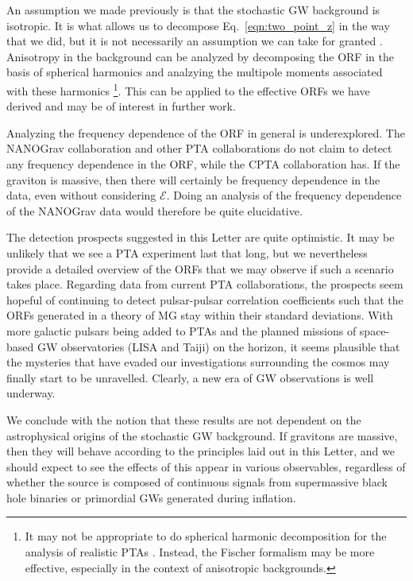 \documentclass[prd,twocolumn,aps,psfig,nofootinbib,nobibnotes,superscriptaddress,preprintnumbers,times]{revtex4-2}
\begin{document}
An assumption we made previously is that the stochastic GW background is isotropic. It is what allows us to decompose Eq.\ \ref{eqn:two_point_z} in the way that we did, but it is not necessarily an assumption we can take for granted \cite{Depta:2024ykq, Bravo:2025csu, Cusin:2025xle, Kuwahara:2024jiz, Li:2024lvt}. Anisotropy in the background can be analyzed by decomposing the ORF in the basis of spherical harmonics and analzying the multipole moments associated with these harmonics \cite{Allen:2024bnk, Gair:2014rwa}\footnote{It may not be appropriate to do spherical harmonic decomposition for the analysis of realistic PTAs \cite{Ali-Haimoud:2020ozu}. Instead, the Fischer formalism may be more effective, especially in the context of anisotropic backgrounds.}. This can be applied to the effective ORFs we have derived and may be of interest in further work. 

Analyzing the frequency dependence of the ORF in general is underexplored. The NANOGrav collaboration and other PTA collaborations do not claim to detect any frequency dependence in the ORF, while the CPTA collaboration has. If the graviton is massive, then there will certainly be frequency dependence in the data, even without considering $\mathcal{E}$. Doing an analysis of the frequency dependence of the NANOGrav data would therefore be quite elucidative. 

The detection prospects suggested in this Letter are quite optimistic. It may be unlikely that we see a PTA experiment last that long, but we nevertheless provide a detailed overview of the ORFs that we may observe if such a scenario takes place. Regarding data from current PTA collaborations, the prospects seem hopeful of continuing to detect pulsar-pulsar correlation coefficients such that the ORFs generated in a theory of MG  stay within their standard deviations. With more galactic pulsars being added to PTAs and the planned missions of space-based GW observatories (LISA and Taiji) on the horizon, it seems plausible that the mysteries that have evaded our investigations surrounding the cosmos may finally start to be unravelled. Clearly, a new era of GW observations is well underway. 

We conclude with the notion that these results are not dependent on the astrophysical origins of the stochastic GW background. If gravitons are massive, then they will behave according to the principles laid out in this Letter, and we should expect to see the effects of this appear in various observables, regardless of whether the source is composed of continuous signals from supermassive black hole binaries or primordial GWs generated during inflation.
\end{document}
